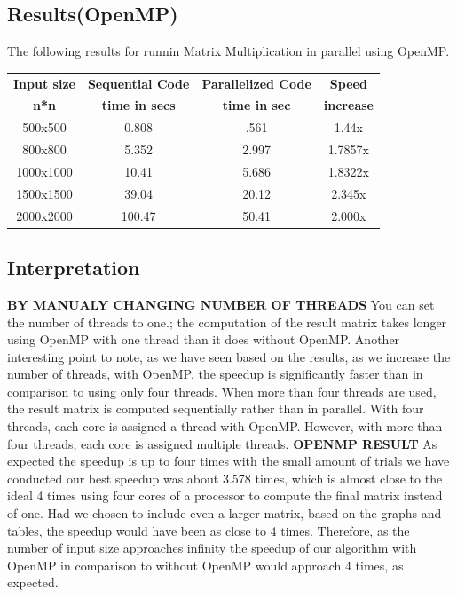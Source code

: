 \documentclass{article}
\newcommand{\head}[1]{\textnormal{\textbf{#1}}}
\begin{document}
\pagebreak
\subsection{Results(OpenMP)}

The following results for runnin Matrix Multiplication in parallel using OpenMP.
\newline
\newline
\begin{tabular}{|c|c|c|c|}
\hline
\head{Input size}&\head{Sequential Code}&\head{Parallelized Code}&\head{Speed}\\
\head{n*n}&\head{time in secs}&\head{time in sec}&\head{increase}\\
\hline
500x500 & 0.808 & .561&1.44x\\
\hline
800x800 & 5.352 & 2.997&1.7857x\\
\hline
1000x1000 & 10.41 & 5.686&1.8322x\\
\hline
1500x1500 & 39.04 & 20.12&2.345x\\
\hline
2000x2000 & 100.47 & 50.41&2.000x\\
\hline
\end{tabular}


\subsection{Interpretation}

\textbf{BY MANUALY CHANGING NUMBER OF THREADS}
You can set the number of threads to one.; the computation of the result matrix takes longer using OpenMP
with one thread than it does without OpenMP. Another interesting point to note, as we have
seen based on the results, as we increase the number of threads, with OpenMP, the speedup is
significantly faster than in comparison to using only four threads. When more than four threads
are used, the result matrix is computed sequentially rather than in parallel. With four threads,
each core is assigned a thread with OpenMP. However, with more than four threads, each core
is assigned multiple threads.
\newline
\newline
\textbf{OPENMP RESULT}
As expected the speedup is up to four times 
with the small amount of trials we have conducted our best speedup was about 3.578 times,
which is almost close to the ideal 4 times using four cores of a processor to compute the final
matrix instead of one. Had we chosen to include even a larger matrix, based on the graphs and
tables, the speedup would have been as close to 4 times. Therefore, as the number of input size
approaches infinity the speedup of our algorithm with OpenMP in comparison to without
OpenMP would approach 4 times, as expected.
\end{document}
